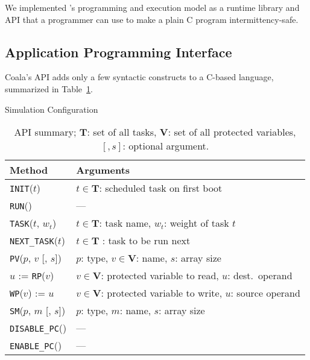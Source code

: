 We implemented \sys's programming and execution model as a runtime library and API that a programmer can use to make a plain C program intermittency-safe.
%
\subsection{Application Programming Interface}
\label{sec:coala_api}
%
Coala's API adds only a few syntactic constructs to a C-based language, summarized
in Table~\ref{table:coala_api}.
%
\begin{table}%
\caption{Simulation Configuration}
\label{tab:one}
\begin{minipage}{\columnwidth}
\begin{center}
\begin{tabular}{ll}
  \toprule
	{Method} & {Arguments} \\
	\hline
	\texttt{INIT}($t$) & $t \in \mathbf{T}$: scheduled task on first boot \\
	\texttt{RUN}() & --- \\
	\texttt{TASK}($t$, $w_t$) & $t \in \mathbf{T}$: task name, $w_t$: weight of task $t$ \\
	\texttt{NEXT\_TASK}($t$) & $t \in \mathbf{T}$ : task to be run next \\
	\texttt{PV}($p$, $v$ [, $s$]) & $p$: type, $v \in \mathbf{V}$: name, $s$: array size \\
	$u$ := \texttt{RP}($v$) & $v \in \mathbf{V}$: protected variable to read, $u$: dest.\ operand \\
	\texttt{WP}($v$) := $u$ &  $v \in \mathbf{V}$: protected variable to write, $u$: source operand \\
	\texttt{SM}($p$, $m$ [, $s$]) & $p$: type, $m$: name, $s$: array size \\
	\texttt{DISABLE\_PC}() & --- \\
	\texttt{ENABLE\_PC}() & --- \\
  \bottomrule
\end{tabular}
\caption{API summary; $\mathbf{T}$: set of all tasks, $\mathbf{V}$: set of all protected variables, $[, s]$: optional argument.}
\label{table:coala_api}
\end{center}
\end{minipage}
\end{table}%
